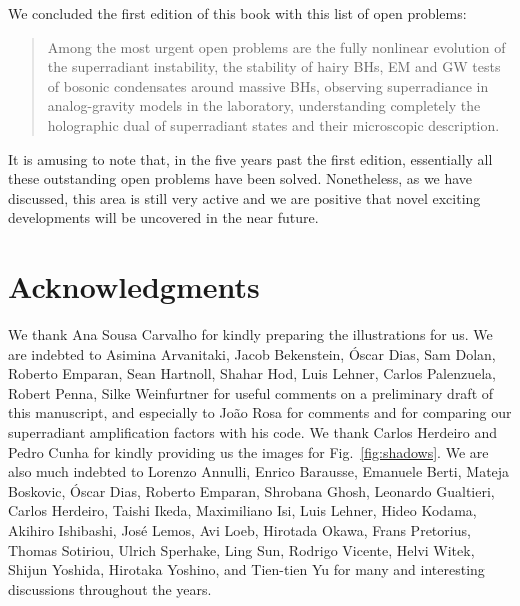 \documentclass[11pt]{article}
\numberwithin{equation}{section} %
\begin{document}
We concluded the first edition of this book with this list of open problems:
\begin{quote}
 Among the most urgent open problems are the fully nonlinear evolution of the superradiant instability, the stability 
 of hairy BHs, EM and GW tests of bosonic condensates around massive BHs, observing superradiance in analog-gravity 
 models in the laboratory, understanding completely the holographic dual of superradiant states and their microscopic 
description.
\end{quote}
It is amusing to note that, in the five years past the first edition, essentially all these outstanding open problems 
have been solved. Nonetheless, as we have discussed, this area is still very active and we are positive that novel 
exciting developments will be uncovered in the near future.





\section*{Acknowledgments}
We thank Ana Sousa Carvalho for kindly preparing the illustrations for us.
%
We are indebted to Asimina Arvanitaki, Jacob Bekenstein, \'Oscar Dias, Sam Dolan, Roberto Emparan, Sean Hartnoll, Shahar Hod, Luis Lehner, Carlos Palenzuela, Robert Penna, Silke Weinfurtner for useful comments on a preliminary draft of this manuscript, and especially to Jo\~ao Rosa for comments and for comparing our superradiant amplification factors with his code. We thank Carlos Herdeiro and Pedro Cunha for kindly providing us the images for Fig.~\ref{fig:shadows}.
%
We are also much indebted to Lorenzo Annulli, Enrico Barausse, Emanuele Berti, Mateja Boskovic, \'Oscar Dias, Roberto 
Emparan, Shrobana Ghosh, Leonardo Gualtieri, Carlos Herdeiro, Taishi Ikeda, Maximiliano Isi, Luis Lehner, Hideo Kodama, 
Akihiro Ishibashi, Jos\'e Lemos, Avi Loeb, Hirotada Okawa, Frans Pretorius, Thomas Sotiriou, Ulrich Sperhake, Ling Sun, 
Rodrigo Vicente, Helvi Witek, Shijun Yoshida, Hirotaka Yoshino, and Tien-tien Yu for many and interesting discussions 
throughout the years.
\end{document}
